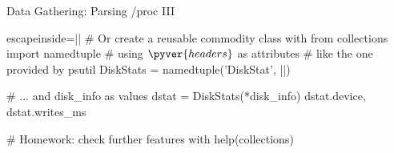 \begin{pyframe}{Data Gathering: Parsing /proc III}
\begin{pycode*}{escapeinside=||}
# Or create a reusable commodity class with
from collections import namedtuple
# using $\pyver{headers}$ as attributes
#  like the one provided by psutil
DiskStats = namedtuple('DiskStat', ||)

# ... and disk_info as values
dstat = DiskStats(*disk_info)
dstat.device, dstat.writes_ms

# Homework: check further features with
help(collections) 
\end{pycode*}
\end{pyframe}


\iffalse
\begin{pyframe}{Data Gathering: subprocess}
\begin{pycode}
# foo
\end{pycode}
\end{pyframe}

\fi
